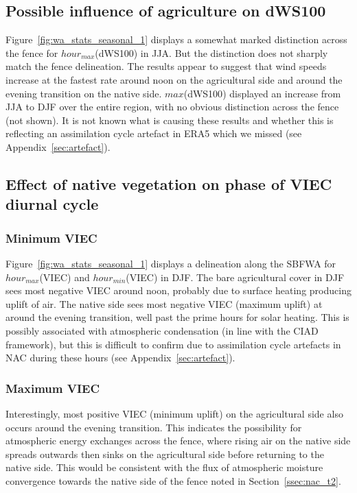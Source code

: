 \subsection{Possible influence of agriculture on dWS100}

Figure~\ref{fig:wa_stats_seasonal_1} displays a somewhat marked distinction across the fence for $hour_{max}$(\acs{dWS100}) in \ac{JJA}. But the distinction does not sharply match the fence delineation. The results appear to suggest that wind speeds increase at the fastest rate around noon on the agricultural side and around the evening transition on the native side. $max$(\acs{dWS100}) displayed an increase from \ac{JJA} to \ac{DJF} over the entire region, with no obvious distinction across the fence (not shown). It is not known what is causing these results and whether this is reflecting an assimilation cycle artefact in \ac{ERA5} which we missed (see Appendix~\ref{sec:artefact}).

\subsection[Effect of native vegetation on VIEC diurnal phase]{Effect of native vegetation on phase of VIEC diurnal cycle}

\subsubsection{Minimum VIEC}

Figure~\ref{fig:wa_stats_seasonal_1} displays a delineation along the \ac{SBFWA} for $hour_{max}$(\acs{VIEC}) and $hour_{min}$(\acs{VIEC}) in \ac{DJF}. The bare agricultural cover in \ac{DJF} sees most negative \ac{VIEC} around noon, probably due to surface heating producing uplift of air. The native side sees most negative \ac{VIEC} (maximum uplift) at around the evening transition, well past the prime hours for solar heating. This is possibly associated with atmospheric condensation (in line with the \ac{CIAD} framework), but this is difficult to confirm due to assimilation cycle artefacts in \ac{NAC} during these hours (see Appendix~\ref{sec:artefact}).

\subsubsection{Maximum VIEC}

Interestingly, most positive \ac{VIEC} (minimum uplift) on the agricultural side also occurs around the evening transition. This indicates the possibility for atmospheric energy exchanges across the fence, where rising air on the native side spreads outwards then sinks on the agricultural side before returning to the native side. This would be consistent with the flux of atmospheric moisture convergence towards the native side of the fence noted in Section~\ref{ssec:nac_t2}.

